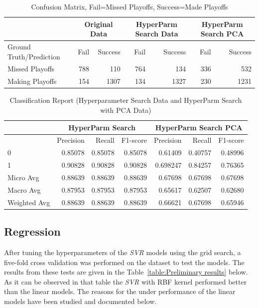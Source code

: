 \documentclass{article}
\begin{document}
\begin{table}[H]
	\caption{Confusion Matrix, Fail=Missed Playoffs, Success=Made Playoffs}
	\begin{tabular}{lrrrrrr}
	\toprule
	& \multicolumn{2}{c}{Original Data} & \multicolumn{2}{c}{HyperParm Search Data} & \multicolumn{2}{c}{HyperParm Search PCA}\\
\midrule	
		Ground Truth/Prediction & Fail & Success & Fail & Success & Fail & Success \\
		Missed Playoffs                        & 788             & 110             & 764             & 134         & 336             & 532              \\
		Making Playoffs                        & 154             & 1307           & 134             & 1327             & 230             & 1231       
	\end{tabular}
\end{table}

\begin{table}[H]
\caption{Classification Report (Hyperparameter Search Data and HyperParm Search with PCA Data)}
\begin{tabular}{lrrrrrr}
\toprule
& \multicolumn{3}{c}{HyperParm Search} & \multicolumn{3}{c}{HyperParm Search PCA} \\
\midrule
     			& Precision & Recall  & F1-score & Precision & Recall  & F1-score  \\
		0            & 0.85078   & 0.85078 & 0.85078 & 0.61409   & 0.40757 & 0.48996  \\
		1            & 0.90828   & 0.90828 & 0.90828    & 0.698247   & 0.84257 & 0.76365 \\
		Micro Avg    & 0.88639   & 0.88639 & 0.88639   & 0.67698   & 0.67698 & 0.67698   \\
		Macro Avg    & 0.87953   & 0.87953 & 0.87953   & 0.65617   & 0.62507 & 0.62680 \\
		Weighted Avg & 0.88639   & 0.88639 & 0.88639  & 0.66621   & 0.67698 & 0.65946 
\end{tabular}
\end{table}


\subsection{Regression}
After tuning the hyperparameters of the \textit{SVR} models using the grid search, a five-fold cross validation was performed on the dataset to test the models.
The results from these tests are given in the Table~\ref{table:Preliminary results} below. 
As it can be observed in that table the \textit{SVR} with RBF kernel performed better than the linear models. 
The reasons for the under performance of the linear models have been studied and documented below. 
\end{document}
